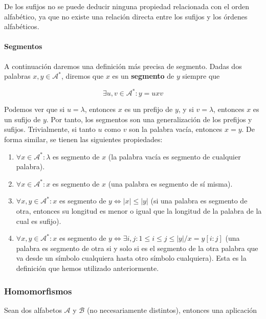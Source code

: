 De los sufijos no se puede deducir ninguna propiedad relacionada con el
orden alfabético, ya que no existe una relación directa entre los
sufijos y los órdenes alfabéticos.

\paragraph{Segmentos}\label{segmentos}

A continuación daremos una definición más precisa de segmento. Dadas dos
palabras \(x,y\in\mathcal{A}^*\), diremos que \(x\) es un
\textbf{segmento} de \(y\) siempre que

\[
\exists u,v\in\mathcal{A}^*:y=uxv
\]

Podemos ver que si \(u=\lambda\), entonces \(x\) es un prefijo de \(y\),
y si \(v=\lambda\), entonces \(x\) es un sufijo de \(y\). Por tanto, los
segmentos son una generalización de los prefijos y sufijos.
Trivialmente, si tanto \(u\) como \(v\) son la palabra vacía, entonces
\(x=y\). De forma similar, se tienen las siguientes propiedades:

\begin{enumerate}
\def\labelenumi{\arabic{enumi}.}
\tightlist
\item
  \(\forall x\in\mathcal{A}^*:\lambda\) es segmento de \(x\) (la palabra
  vacía es segmento de cualquier palabra).
\item
  \(\forall x\in\mathcal{A}^*:x\) es segmento de \(x\) (una palabra es
  segmento de sí misma).
\item
  \(\forall x,y\in\mathcal{A}^*:x\) es segmento de
  \(y \Leftrightarrow |x| \leq |y|\) (si una palabra es segmento de
  otra, entonces su longitud es menor o igual que la longitud de la
  palabra de la cual es sufijo).
\item
  \(\forall x,y\in\mathcal{A}^*:x\) es segmento de
  \(y\Leftrightarrow \exists i,j: 1\leq i\leq j\leq |y| / x=y[i:j]\)
  (una palabra es segmento de otra si y solo si es el segmento de la
  otra palabra que va desde un símbolo cualquiera hasta otro símbolo
  cualquiera). Esta es la definición que hemos utilizado anteriormente.
\end{enumerate}

\subsubsection{Homomorfismos}\label{homomorfismos}

Sean dos alfabetos \(\mathcal{A}\) y \(\mathcal{B}\) (no necesariamente
distintos), entonces una aplicación

